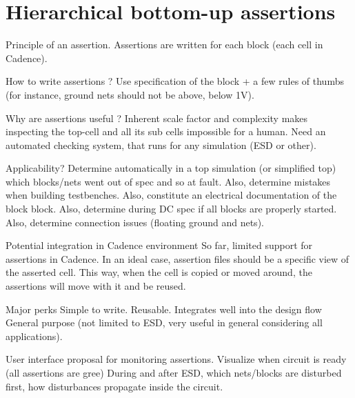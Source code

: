 \section{Hierarchical bottom-up assertions}

Principle of an assertion. Assertions are written for each block (each cell in Cadence).

How to write assertions ?
Use specification of the block + a few rules of thumbs (for instance, ground nets should not be above, below 1V).

Why are assertions useful ?
Inherent scale factor and complexity makes inspecting the top-cell and all its sub cells impossible for a human.
Need an automated checking system, that runs for any simulation (ESD or other).

Applicability?
Determine automatically in a top simulation (or simplified top) which blocks/nets went out of spec and so at fault.
Also, determine mistakes when building testbenches.
Also, constitute an electrical documentation of the block block.
Also, determine during DC spec if all blocks are properly started.
Also, determine connection issues (floating ground and nets).

Potential integration in Cadence environment
So far, limited support for assertions in Cadence.
In an ideal case, assertion files should be a specific view of the asserted cell.
This way, when the cell is copied or moved around, the assertions will move with it and be reused.

Major perks
Simple to write.
Reusable.
Integrates well into the design flow
General purpose (not limited to ESD, very useful in general considering all applications).

User interface proposal for monitoring assertions.
Visualize when circuit is ready (all assertions are gree)
During and after ESD, which nets/blocks are disturbed first, how disturbances propagate inside the circuit.
